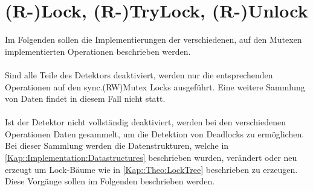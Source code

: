 \section{(R-)Lock, (R-)TryLock, (R-)Unlock}
Im Folgenden sollen die Implementierungen der verschiedenen, auf den Mutexen
implementierten Operationen beschrieben werden.\\\\ 
Sind alle Teile des Detektors deaktiviert, werden nur die entsprechenden 
Operationen auf den sync.(RW)Mutex Locks ausgeführt. Eine weitere Sammlung von Daten
findet in diesem Fall nicht statt.\\\\
Ist der Detektor nicht vollständig deaktiviert, werden bei den verschiedenen 
Operationen Daten gesammelt, um die Detektion von Deadlocks zu ermöglichen.  
Bei dieser Sammlung werden die Datenstrukturen,
welche in \ref{Kap::Implementation:Datastructures} beschrieben wurden, verändert
oder neu erzeugt um Lock-Bäume wie in \ref{Kap::Theo:LockTree} beschrieben zu 
erzeugen.\\
Diese Vorgänge sollen im Folgenden beschrieben werden.
